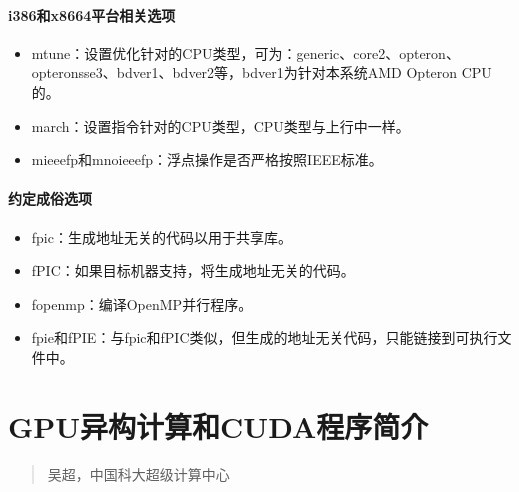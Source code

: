 \documentclass[a4paper,12pt,english]{sphinxmanual}
\begin{document}
\subsubsection{i386和x86\sphinxhyphen{}64平台相关选项}
\label{\detokenize{compiler/gnu:i386x86-64}}\begin{itemize}
\item {} 
\sphinxAtStartPar
\sphinxhyphen{}mtune：设置优化针对的CPU类型，可为：generic、core2、opteron、opteron\sphinxhyphen{}sse3、bdver1、bdver2等，bdver1为针对本系统AMD
Opteron CPU的。

\item {} 
\sphinxAtStartPar
\sphinxhyphen{}march：设置指令针对的CPU类型，CPU类型与上行中一样。

\item {} 
\sphinxAtStartPar
\sphinxhyphen{}mieee\sphinxhyphen{}fp和\sphinxhyphen{}mno\sphinxhyphen{}ieee\sphinxhyphen{}fp：浮点操作是否严格按照IEEE标准。

\end{itemize}


\subsubsection{约定成俗选项}
\label{\detokenize{compiler/gnu:id13}}\begin{itemize}
\item {} 
\sphinxAtStartPar
\sphinxhyphen{}fpic：生成地址无关的代码以用于共享库。

\item {} 
\sphinxAtStartPar
\sphinxhyphen{}fPIC：如果目标机器支持，将生成地址无关的代码。

\item {} 
\sphinxAtStartPar
\sphinxhyphen{}fopenmp：编译OpenMP并行程序。

\item {} 
\sphinxAtStartPar
\sphinxhyphen{}fpie和\sphinxhyphen{}fPIE：与\sphinxhyphen{}fpic和\sphinxhyphen{}fPIC类似，但生成的地址无关代码，只能链接到可执行文件中。

\end{itemize}

\sphinxstepscope


\chapter{GPU异构计算和CUDA程序简介}
\label{\detokenize{gpu-computing/gpu-computing:gpucuda}}\label{\detokenize{gpu-computing/gpu-computing::doc}}\begin{quote}\begin{description}
\sphinxAtStartPar
吴超，中国科大超级计算中心

\end{description}\end{quote}
\end{document}
